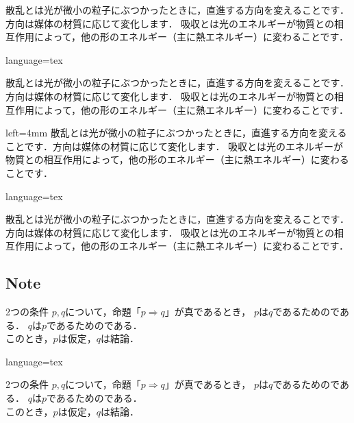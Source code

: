 \documentclass[../main]{subfiles}
\begin{document}
\HRuleLeader

\begin{Memo}[width=1pt,color=blue]{}
    散乱とは光が微小の粒子にぶつかったときに，直進する方向を変えることです．方向は媒体の材質に応じて変化します．
    吸収とは光のエネルギーが物質との相互作用によって，他の形のエネルギー（主に熱エネルギー）に変わることです．
\end{Memo}
\begin{Code}{language=tex}
\begin{Memo}[width=1pt,color=blue]{}
    散乱とは光が微小の粒子にぶつかったときに，直進する方向を変えることです．方向は媒体の材質に応じて変化します．
    吸収とは光のエネルギーが物質との相互作用によって，他の形のエネルギー（主に熱エネルギー）に変わることです．
\end{Memo}
\end{Code}

\HRuleLeader

\begin{Memo}[width=5pt,color=red]{left=4mm}
散乱とは光が微小の粒子にぶつかったときに，直進する方向を変えることです．方向は媒体の材質に応じて変化します．
吸収とは光のエネルギーが物質との相互作用によって，他の形のエネルギー（主に熱エネルギー）に変わることです．
\end{Memo}
\begin{Code}{language=tex}
\begin{Memo}[width=5pt,color=red]{}
    散乱とは光が微小の粒子にぶつかったときに，直進する方向を変えることです．方向は媒体の材質に応じて変化します．
    吸収とは光のエネルギーが物質との相互作用によって，他の形のエネルギー（主に熱エネルギー）に変わることです．
\end{Memo}
\end{Code}

\subsection{Note}
\begin{Note}{}
    2つの条件 $p,q$について，命題「$p \Rightarrow q$」が真であるとき，
    $p$は$q$であるためのである．
    $q$は$p$であるためのである． \\
    このとき，$p$は仮定，$q$は結論．
\end{Note}
\begin{Code}{language=tex}
\begin{Note}{}
    2つの条件 $p,q$について，命題「$p \Rightarrow q$」が真であるとき，
    $p$は$q$であるためのである．
    $q$は$p$であるためのである． \\
    このとき，$p$は仮定，$q$は結論．
\end{Note}
\end{Code}
\end{document}
